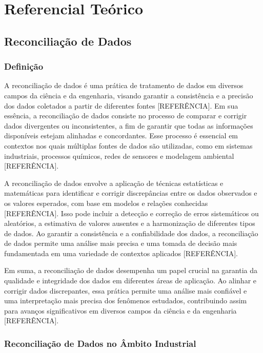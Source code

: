 \chapter{Referencial Teórico} \label{RevisaoBibliografica}

\section{Reconciliação de Dados}

\subsection{Definição}

A reconciliação de dados é uma prática de tratamento de dados em diversos campos da ciência e da engenharia, visando garantir a consistência e a precisão dos dados coletados a partir de diferentes fontes [REFERÊNCIA]. Em sua essência, a reconciliação de dados consiste no processo de comparar e corrigir dados divergentes ou inconsistentes, a fim de garantir que todas as informações disponíveis estejam alinhadas e concordantes. Esse processo é essencial em contextos nos quais múltiplas fontes de dados são utilizadas, como em sistemas industriais, processos químicos, redes de sensores e modelagem ambiental [REFERÊNCIA].

A reconciliação de dados envolve a aplicação de técnicas estatísticas e matemáticas para identificar e corrigir discrepâncias entre os dados observados e os valores esperados, com base em modelos e relações conhecidas [REFERÊNCIA]. Isso pode incluir a detecção e correção de erros sistemáticos ou aleatórios, a estimativa de valores ausentes e a harmonização de diferentes tipos de dados. Ao garantir a consistência e a confiabilidade dos dados, a reconciliação de dados permite uma análise mais precisa e uma tomada de decisão mais fundamentada em uma variedade de contextos aplicados [REFERÊNCIA].

Em suma, a reconciliação de dados desempenha um papel crucial na garantia da qualidade e integridade dos dados em diferentes áreas de aplicação. Ao alinhar e corrigir dados discrepantes, essa prática permite uma análise mais confiável e uma interpretação mais precisa dos fenômenos estudados, contribuindo assim para avanços significativos em diversos campos da ciência e da engenharia [REFERÊNCIA].

\subsection{Reconciliação de Dados no Âmbito Industrial}

